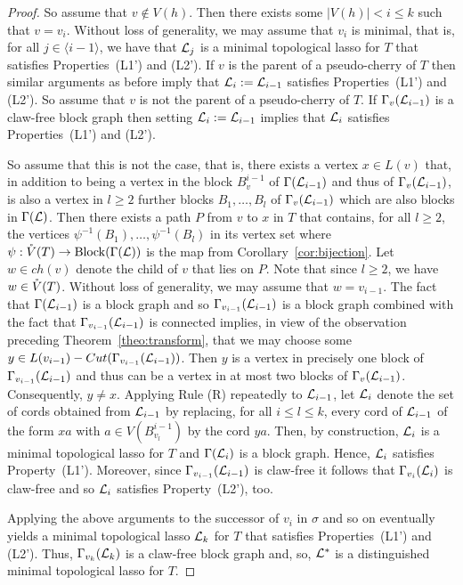 \begin{proof}
So assume that $v\not\in V(h)$. Then there exists some 
$|V(h)|< i\leq k$ such that $v=v_i$. Without loss of generality, 
we may assume that $v_i$ is minimal, 
that is, for all $j\in\langle i-1\rangle$, we have that
${\mathcal L}_j$ is a minimal topological lasso for $T$ that
satisfies Properties~(L1') and (L2'). If $v$ is the 
parent of a pseudo-cherry of $T$ then similar
arguments as before imply that ${\mathcal L}_i:={\mathcal L}_{i-1}$
satisfies Properties~(L1') and (L2'). So assume that
$v$ is not the parent of a pseudo-cherry of $T$.
If $\Gamma_v({\mathcal L}_{i-1})$ is a claw-free  block graph  then
setting ${\mathcal L}_i:={\mathcal L}_{i-1}$ implies that ${\mathcal L}_i$ satisfies
Properties~(L1') and (L2').

So assume that 
this is not the case, that is, there exists a vertex $x\in L(v)$
that, in addition to being  a vertex in the block 
$B_v^{i-1}$ of $\Gamma({\mathcal L}_{i-1})$
 and thus  of $\Gamma_v({\mathcal L}_{i-1})$,
is also a vertex in $l\geq 2$ further blocks $B_1,\ldots, B_l$
 of $\Gamma_v({\mathcal L}_{i-1})$ which are also blocks in 
$\Gamma({\mathcal L})$. Then there exists a path $P$ from $v$ 
 to $x$ in $T$ that contains, for all $l\geq 2$, the vertices 
 $\psi^{-1}(B_1),\ldots, \psi^{-1}(B_l)$ in its vertex set
where $\psi:\mathring{V}(T)\to \operatorname*{Block}(\Gamma({\mathcal L}))$ is the map from 
Corollary~\ref{cor:bijection}. Let $w\in ch(v)$
 denote the child of $v$ that lies on $P$. Note that since $l\geq 2$, 
we have $w\in \mathring{V}(T)$. Without loss of generality, 
 we may assume that $w=v_{i-1}$. 
 The fact that  $\Gamma({\mathcal L}_{i-1})$ is a block graph and so
  $\Gamma_{v_{i-1}}({\mathcal L}_{i-1})$ is a block graph combined with
the fact that  $\Gamma_{v_{i-1}}({\mathcal L}_{i-1})$ is connected 
 implies, in view of the observation
preceding Theorem~\ref{theo:transform}, that
we may choose some
 $y\in L(v_{i-1})-Cut(\Gamma_{v_{i-1}}({\mathcal L}_{i-1}))$. Then $y$
 is a vertex in precisely one block of $\Gamma_{v_{i-1}}({\mathcal L}_{i-1})$
 and thus can be a vertex in at most two 
 blocks of $\Gamma_v({\mathcal L}_{i-1})$.
Consequently, $y\not=x$. 
Applying Rule (R) repeatedly to ${\mathcal L}_{i-1}$, 
let ${\mathcal L}_i$ denote the set of cords obtained
from ${\mathcal L}_{i-1}$ by replacing, for all $i\leq l\leq k$, every cord 
of ${\mathcal L}_{i-1}$ of the form $xa$ with $a\in V(B_{v_l}^{i-1})$ by the cord
$ya$. Then, by construction, ${\mathcal L}_i$ is a minimal topological lasso
for $T$ and $\Gamma({\mathcal L}_i)$ is a block graph. Hence, ${\mathcal L}_i$ satisfies
Property~(L1'). Moreover, since
$\Gamma_{v_{i-1}}({\mathcal L}_{i-1})$ is claw-free it follows that
$\Gamma_{v_i}({\mathcal L}_i)$ is claw-free and so ${\mathcal L}_i$ satisfies
Property~(L2'), too.

Applying the above arguments to the successor of $v_i$ 
in $\sigma$ and so on eventually
yields a minimal topological lasso ${\mathcal L}_k$ for $T$  
that satisfies Properties~(L1') and (L2'). Thus,
$\Gamma_{v_k}({\mathcal L}_k) $ is a claw-free block graph
and, so, ${\mathcal L}^*$ is a distinguished
minimal topological lasso for $T$.
\qquad
\end{proof}

